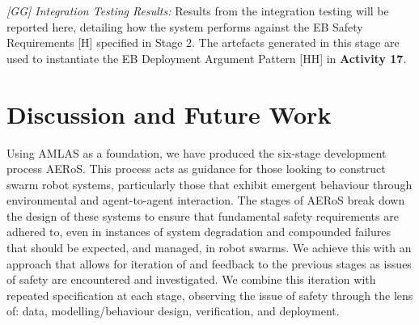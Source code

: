 \documentclass[runningheads]{llncs}
\begin{document}
\emph{[GG] Integration Testing Results:} Results from the integration testing will be reported here, detailing how the system performs against the EB Safety Requirements [H] specified in Stage 2. 
The artefacts generated in this stage are used to instantiate the EB Deployment Argument Pattern [HH] in \textbf{Activity 17}.
\section{Discussion and Future Work} \label{discussion-conclusions}
Using AMLAS \cite{Hawkins2021} as a foundation, we have produced the six-stage development process AERoS. This process acts as guidance for those looking to construct swarm robot systems, particularly those that exhibit emergent behaviour through environmental and agent-to-agent interaction. The stages of AERoS break down the design of these systems to ensure that fundamental safety requirements are adhered to, even in instances of system degradation and compounded failures that should be expected, and managed, in robot swarms. We achieve this with an approach that allows for iteration of and feedback to the previous stages as issues of safety are encountered and investigated. We combine this iteration with repeated specification at each stage, observing the issue of safety through the lens of: data, modelling/behaviour design, verification, and deployment. 
\end{document}
